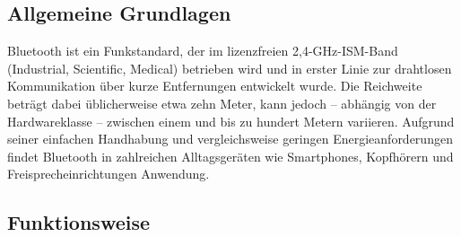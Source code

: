 \documentclass[a4paper, 12pt]{article} %
\begin{document}
\subsection{Allgemeine Grundlagen}

\begin{spacing}{1.8}  %
\fontsize{14pt}{15pt}\selectfont  %

Bluetooth ist ein Funkstandard, der im lizenzfreien 2,4-GHz-ISM-Band (Industrial, Scientific, Medical) betrieben wird und in erster Linie zur drahtlosen Kommunikation über kurze Entfernungen entwickelt wurde. Die Reichweite beträgt dabei üblicherweise etwa zehn Meter, kann jedoch – abhängig von der Hardwareklasse – zwischen einem und bis zu hundert Metern variieren. Aufgrund seiner einfachen Handhabung und vergleichsweise geringen Energieanforderungen findet Bluetooth in 
zahlreichen Alltagsgeräten wie Smartphones, Kopfhörern und Freisprecheinrichtungen Anwendung.

\end{spacing}

\subsection{Funktionsweise}
\end{document}
